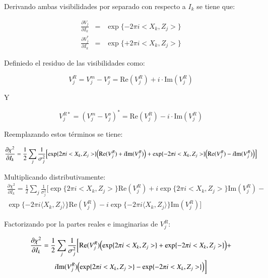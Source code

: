 Derivando ambas visibilidades por separado con respecto a $I_{k}$ se tiene que:

\begin{eqnarray}
\frac{\partial V_{j}}{\partial I_{k}} & = & \exp\{-2\pi i<X_k,Z_j>\} \\
\frac{\partial V_{j}^{*}}{\partial I_{k}} & = & \exp\{+2\pi i<X_k,Z_j>\}
\end{eqnarray}

Definiedo el residuo de las visibilidades como:

\begin{equation}
V_{j}^{R} = V_{j}^{m}-V_{j}^{o} = \text{Re}(V_{j}^{R}) + i\cdot \text{Im}(V_{j}^{R})
\end{equation}

Y

\begin{equation}
V_{j}^{R*} = (V_{j}^{m}-V_{j}^{o})^{*}=\text{Re}(V_{j}^{R})-i\cdot \text{Im}(V_{j}^{R})
\end{equation}

Reemplazando estos términos se tiene:


\begin{equation}
\frac{\partial\chi^{2}}{\partial I_{k}} = \frac{1}{2}\sum\limits_{j}\frac{1}{\sigma_{j}^{2}}\Bigl[\exp\{2\pi i<X_k,Z_j>\}\Bigl(\text{Re}(V_{j}^{R})+i\text{Im}(V_{j}^{R})\Bigr)+
              \exp\{-2\pi i<X_k,Z_j>\}\Bigl(\text{Re}(V_{j}^{R})-i\text{Im}(V_{j}^{R})\Bigr)\Bigr]
\end{equation}

Multiplicando distributivamente:
\begin{multline}
\frac{\partial\chi^{2}}{\partial I_{k}} = \frac{1}{2}\sum\limits_{j}\frac{1}{\sigma_{j}^{2}}\biggl[\exp\{2\pi i<X_k,Z_j>\}\text{Re}(V_{j}^{R})+i\exp\{2\pi i<X_k,Z_j>\}\text{Im}(V_{j}^{R})-\\
\exp\{-2\pi i \langle X_k,Z_j \rangle\}\text{Re}(V_{j}^{R})-i\exp\{-2\pi i\langle X_k,Z_j \rangle\}\text{Im}(V_{j}^{R})\biggr]
\end{multline}


Factorizando por la partes reales e imaginarias de $V_{j}^{R}$:

\begin{multline}
\frac{\partial\chi^{2}}{\partial I_{k}} = \frac{1}{2}\sum\limits_{j}\frac{1}{\sigma_{j}^{2}}\biggl[\text{Re}(V_{j}^{R})\Bigl(\exp\{2\pi i<X_k,Z_j>\}+\exp\{-2\pi i<X_k,Z_j>\}\Bigr)+ \\ i\text{Im}(V_{j}^{R})\Bigl(\exp\{2\pi i<X_k,Z_j>\}-\exp\{-2\pi i<X_k,Z_j>\}\Bigr)\biggr]
\end{multline}

